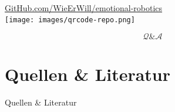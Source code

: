 \documentclass[aspectratio=169]{beamer}
\begin{document}
\begin{frame}[c]{}
  \centering
  \begin{minipage}{\textwidth}
    \centering
    \Large {}\\
    \href{https://github.com/wieerwill/emotional-robotics}{GitHub.com/WieErWill/emotional-robotics}\\
    \vspace{.4cm}
    \texttt{[image: images/qrcode-repo.png]}
  \end{minipage}
\end{frame}

\begin{frame}[c]{}
  \centering
  \begin{minipage}{\textwidth}
    \centering
    \Huge \[\mathcal Q \& \mathcal A\]
    \Large {}
  \end{minipage}
\end{frame}

\section{Quellen \& Literatur}
\begin{frame}[allowframebreaks]{Quellen \& Literatur}
  \scriptsize
  
  
\end{frame}
\end{document}
